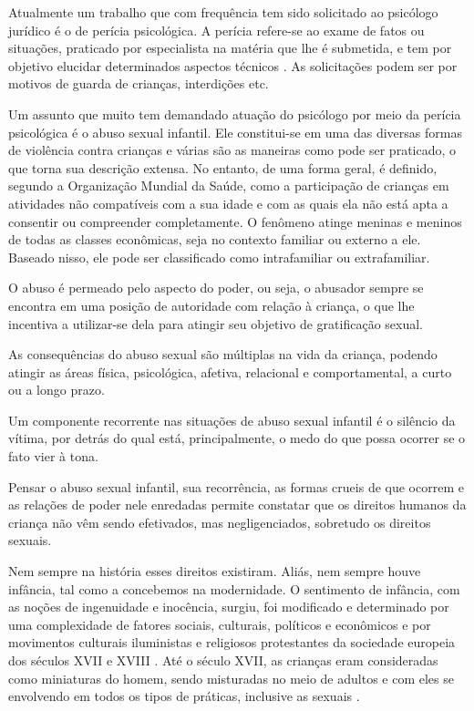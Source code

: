 Atualmente um trabalho que com frequência tem sido solicitado ao psicólogo jurídico é o de perícia psicológica. A perícia refere-se ao exame de fatos ou situações, praticado por especialista na matéria que lhe é submetida, e tem por objetivo elucidar determinados aspectos técnicos . As solicitações podem ser por motivos de guarda de crianças, interdições etc. 

Um assunto que muito tem demandado atuação do psicólogo por meio da perícia psicológica é o abuso sexual infantil. Ele constitui-se em uma das diversas formas de violência contra crianças e várias são as maneiras como pode ser praticado, o que torna sua descrição extensa. No entanto, de uma forma geral, é definido, segundo a Organização Mundial da Saúde, como a participação de crianças em atividades não compatíveis com a sua idade e com as quais ela não está apta a consentir ou compreender completamente. O fenômeno atinge meninas e meninos de todas as classes econômicas, seja no contexto familiar ou externo a ele. Baseado nisso, ele pode ser classificado como intrafamiliar ou extrafamiliar.

O abuso é permeado pelo aspecto do poder, ou seja, o abusador sempre se encontra em uma posição de autoridade com relação à criança, o que lhe incentiva a utilizar-se dela para atingir seu objetivo de gratificação sexual. 

As consequências do abuso sexual são múltiplas na vida da criança, podendo atingir as áreas física, psicológica, afetiva, relacional e comportamental, a curto ou a longo prazo. 

Um componente recorrente nas situações de abuso sexual infantil é o silêncio da vítima, por detrás do qual está, principalmente, o medo do que possa ocorrer se o fato vier à tona. 

Pensar o abuso sexual infantil, sua recorrência, as formas crueis de que ocorrem e as relações de poder nele enredadas permite constatar que os direitos humanos da criança não vêm sendo efetivados, mas negligenciados, sobretudo os direitos sexuais.  

Nem sempre na história esses direitos existiram. Aliás, nem sempre houve infância, tal como a concebemos na modernidade. O sentimento de infância, com as noções de ingenuidade e inocência, surgiu, foi modificado e determinado por uma complexidade de fatores sociais, culturais, políticos e econômicos e por movimentos culturais iluministas e religiosos protestantes da sociedade europeia dos séculos XVII e XVIII \cite{ARIES1981}. Até o século XVII, as crianças eram consideradas como miniaturas do homem, sendo misturadas no meio de adultos e com eles se envolvendo em todos os tipos de práticas, inclusive as sexuais \cite{ARIES2011}.

